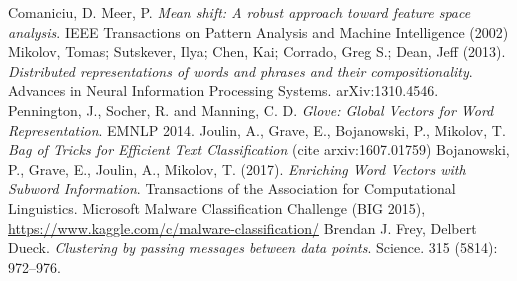 \documentclass[oneside, twocolumn, a4paper, 10pt]{IEEEtran}
\begin{document}
\begin{thebibliography}{6}
 Comaniciu, D. Meer, P. \textit{Mean shift: A robust approach toward feature space analysis}. IEEE Transactions on Pattern Analysis and Machine Intelligence (2002)
 Mikolov, Tomas; Sutskever, Ilya; Chen, Kai; Corrado, Greg S.; Dean, Jeff (2013). \textit{Distributed representations of words and phrases and their compositionality}. Advances in Neural Information Processing Systems. arXiv:1310.4546.
 Pennington, J., Socher, R. and Manning, C. D. \textit{Glove: Global Vectors for Word Representation}. EMNLP 2014.
 Joulin, A., Grave, E., Bojanowski, P., Mikolov, T. \textit{Bag of Tricks for Efficient Text Classification} (cite arxiv:1607.01759)
 Bojanowski, P., Grave, E., Joulin, A.,  Mikolov, T. (2017). \textit{Enriching Word Vectors with Subword Information}. Transactions of the Association for Computational Linguistics.
 Microsoft Malware Classification Challenge (BIG 2015), \url{https://www.kaggle.com/c/malware-classification/}
 Brendan J. Frey, Delbert Dueck. \textit{Clustering by passing messages between data points}. Science. 315 (5814): 972–976.
\end{thebibliography}
\end{document}
